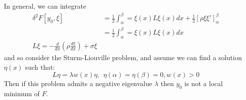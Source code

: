 \documentclass[../Main.tex]{subfiles}
\begin{document}
In general, we can integrate %
\begin{align*}
    \delta^2 F[y_0, \xi] &= \frac{1}{2} \int_\alpha^\beta = \xi(x) L\xi(x) dx + \frac{1}{2} \left[\rho \xi \xi'\right]_\alpha^\beta \\
    &= \frac{1}{2} \int_\alpha^\beta = \xi(x) L\xi(x) dx \\
    L\xi = -\frac{d}{dx} \left(\rho \frac{d\xi}{dx}\right) + \sigma \xi
\end{align*}
and so consider the Sturm-Liouville problem, and assume we can find a solution $\eta(x)$ such that:
\begin{equation*}
    L\eta = \lambda w(x) \eta,~~\eta(\alpha) = \eta(\beta) = 0, w(x) > 0
\end{equation*}
Then if this problem admits a negative eigenvalue $\lambda$ then $y_0$ is not a local minimum of $F$.
\end{document}
